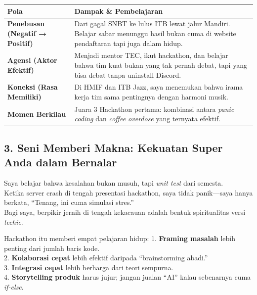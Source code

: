 \documentclass[
  letterpaper,
  DIV=11,
  numbers=noendperiod]{scrreprt}
\begin{document}
\begin{longtable}[]{@{}
  >{\raggedright\arraybackslash}p{}
  >{\raggedright\arraybackslash}p{}@{}}
\toprule\noalign{}
\begin{minipage}[b]{\linewidth}\raggedright
Pola
\end{minipage} & \begin{minipage}[b]{\linewidth}\raggedright
Dampak \& Pembelajaran
\end{minipage} \\
\midrule\noalign{}
\endhead
\bottomrule\noalign{}
\endlastfoot
\textbf{Penebusan (Negatif → Positif)} & Dari gagal SNBT ke lulus ITB
lewat jalur Mandiri. Belajar sabar menunggu hasil bukan cuma di website
pendaftaran tapi juga dalam hidup. \\
\textbf{Agensi (Aktor Efektif)} & Menjadi mentor TEC, ikut hackathon,
dan belajar bahwa tim kuat bukan yang tak pernah debat, tapi yang bisa
debat tanpa uninstall Discord. \\
\textbf{Koneksi (Rasa Memiliki)} & Di HMIF dan ITB Jazz, saya menemukan
bahwa irama kerja tim sama pentingnya dengan harmoni musik. \\
\textbf{Momen Berkilau} & Juara 3 Hackathon pertama: kombinasi antara
\emph{panic coding} dan \emph{coffee overdose} yang ternyata efektif. \\
\end{longtable}

\subsection{\texorpdfstring{\textbf{3. Seni Memberi Makna: Kekuatan
Super Anda dalam
Bernalar}}{3. Seni Memberi Makna: Kekuatan Super Anda dalam Bernalar}}\label{seni-memberi-makna-kekuatan-super-anda-dalam-bernalar}

Saya belajar bahwa kesalahan bukan musuh, tapi \emph{unit test} dari
semesta.\\
Ketika server crash di tengah presentasi hackathon, saya tidak
panik---saya hanya berkata, ``Tenang, ini cuma simulasi stres.''\\
Bagi saya, berpikir jernih di tengah kekacauan adalah bentuk
spiritualitas versi \emph{techie}.

Hackathon itu memberi empat pelajaran hidup: 1. \textbf{Framing masalah}
lebih penting dari jumlah baris kode.\\
2. \textbf{Kolaborasi cepat} lebih efektif daripada ``brainstorming
abadi.''\\
3. \textbf{Integrasi cepat} lebih berharga dari teori sempurna.\\
4. \textbf{Storytelling produk} harus jujur; jangan jualan ``AI'' kalau
sebenarnya cuma \emph{if-else}.
\end{document}
